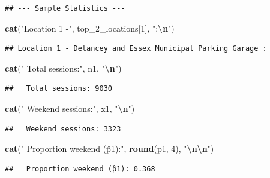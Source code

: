 \documentclass[
  12pt,
]{article}
\newenvironment{Shaded}{\begin{snugshade}}{\end{snugshade}}
\newcommand{\DecValTok}[1]{\textcolor[rgb]{0.00,0.00,0.81}{#1}}
\newcommand{\FunctionTok}[1]{\textcolor[rgb]{0.13,0.29,0.53}{\textbf{#1}}}
\newcommand{\NormalTok}[1]{#1}
\newcommand{\SpecialCharTok}[1]{\textcolor[rgb]{0.81,0.36,0.00}{\textbf{#1}}}
\newcommand{\StringTok}[1]{\textcolor[rgb]{0.31,0.60,0.02}{#1}}
\begin{document}
\begin{verbatim}
## --- Sample Statistics ---
\end{verbatim}

\begin{Shaded}
\begin{Highlighting}[]
\FunctionTok{cat}\NormalTok{(}\StringTok{"Location 1 {-}"}\NormalTok{, top\_2\_locations[}\DecValTok{1}\NormalTok{], }\StringTok{":}\SpecialCharTok{\textbackslash{}n}\StringTok{"}\NormalTok{)}
\end{Highlighting}
\end{Shaded}

\begin{verbatim}
## Location 1 - Delancey and Essex Municipal Parking Garage :
\end{verbatim}

\begin{Shaded}
\begin{Highlighting}[]
\FunctionTok{cat}\NormalTok{(}\StringTok{"  Total sessions:"}\NormalTok{, n1, }\StringTok{"}\SpecialCharTok{\textbackslash{}n}\StringTok{"}\NormalTok{)}
\end{Highlighting}
\end{Shaded}

\begin{verbatim}
##   Total sessions: 9030
\end{verbatim}

\begin{Shaded}
\begin{Highlighting}[]
\FunctionTok{cat}\NormalTok{(}\StringTok{"  Weekend sessions:"}\NormalTok{, x1, }\StringTok{"}\SpecialCharTok{\textbackslash{}n}\StringTok{"}\NormalTok{)}
\end{Highlighting}
\end{Shaded}

\begin{verbatim}
##   Weekend sessions: 3323
\end{verbatim}

\begin{Shaded}
\begin{Highlighting}[]
\FunctionTok{cat}\NormalTok{(}\StringTok{"  Proportion weekend (p̂1):"}\NormalTok{, }\FunctionTok{round}\NormalTok{(p1, }\DecValTok{4}\NormalTok{), }\StringTok{"}\SpecialCharTok{\textbackslash{}n\textbackslash{}n}\StringTok{"}\NormalTok{)}
\end{Highlighting}
\end{Shaded}

\begin{verbatim}
##   Proportion weekend (p̂1): 0.368
\end{verbatim}
\end{document}
